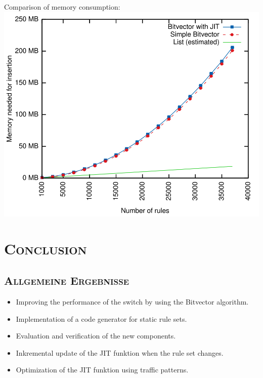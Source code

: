 \documentclass[xcolor=x11names,compress]{beamer}
\renewcommand{\(}{\begin{columns}}
\renewcommand{\)}{\end{columns}}
\newcommand{\<}[1]{\begin{column}{#1}}
\renewcommand{\>}{\end{column}}
\begin{document}
\begin{frame}
  Comparison of memory consumption:
  \includegraphics[height=0.9\textheight]{figures/eval_mem}
\end{frame}

\section{\scshape Conclusion}
\begin{frame}
  \centering\Huge{\insertsection}
\end{frame}

\subsection{\scshape Allgemeine Ergebnisse}
\begin{frame}
  \begin{tcolorbox}[colback=teal!5!white,colframe=teal!75!black,title=Wichtigste Ergebnisse,drop fuzzy shadow]%
    \begin{itemize}
      \item Improving the performance of the switch by using the Bitvector algorithm.
      \item Implementation of a code generator for static rule sets.
      \item Evaluation and verification of the new components.
    \end{itemize}
  \end{tcolorbox}
  \pause
  \begin{tcolorbox}[colback=blue!5!white,colframe=blue!75!black,title=Future Work,drop fuzzy shadow]
    \begin{itemize}
      \item Inkremental update of the JIT funktion when the rule set changes.
      \item Optimization of the JIT funktion using traffic patterns.
    \end{itemize}
  \end{tcolorbox}
\end{frame}
\end{document}
